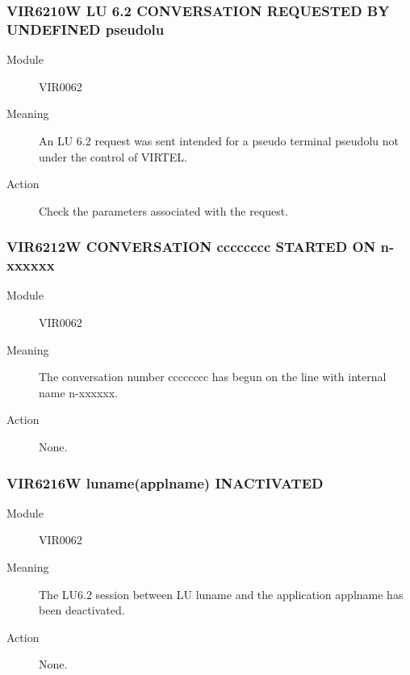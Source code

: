\documentclass[letterpaper,10pt,english]{sphinxmanual}
\begin{document}
\subsubsection{VIR6210W LU 6.2 CONVERSATION REQUESTED BY UNDEFINED pseudolu}
\label{\detokenize{messages:vir6210w-lu-6-2-conversation-requested-by-undefined-pseudolu}}\begin{description}
\item[{Module}] \leavevmode
VIR0062

\item[{Meaning}] \leavevmode
An LU 6.2 request was sent intended for a pseudo terminal pseudolu not under the control of VIRTEL.

\item[{Action}] \leavevmode
Check the parameters associated with the request.

\end{description}


\subsubsection{VIR6212W CONVERSATION cccccccc STARTED  ON n-xxxxxx}
\label{\detokenize{messages:vir6212w-conversation-cccccccc-started-on-n-xxxxxx}}\begin{description}
\item[{Module}] \leavevmode
VIR0062

\item[{Meaning}] \leavevmode
The conversation number cccccccc has begun on the line with internal name n-xxxxxx.

\item[{Action}] \leavevmode
None.

\end{description}


\subsubsection{VIR6216W luname(applname) INACTIVATED}
\label{\detokenize{messages:vir6216w-luname-applname-inactivated}}\begin{description}
\item[{Module}] \leavevmode
VIR0062

\item[{Meaning}] \leavevmode
The LU6.2 session between LU luname and the application applname has been deactivated.

\item[{Action}] \leavevmode
None.

\end{description}
\end{document}
